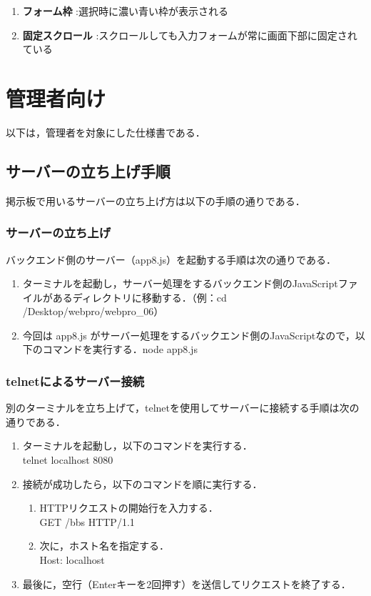 \documentclass[uplatex,dvipdfmx]{jsarticle}
\begin{document}
\begin{enumerate}
    \item \textbf{フォーム枠} :選択時に濃い青い枠が表示される
    \item \textbf{固定スクロール} :スクロールしても入力フォームが常に画面下部に固定されている
\end{enumerate}



\clearpage
\section{管理者向け}
以下は，管理者を対象にした仕様書である．

\subsection{サーバーの立ち上げ手順}
掲示板で用いるサーバーの立ち上げ方は以下の手順の通りである．

\subsubsection{サーバーの立ち上げ}
バックエンド側のサーバー（app8.js）を起動する手順は次の通りである．
\begin{enumerate}
    \item ターミナルを起動し，サーバー処理をするバックエンド側のJavaScriptファイルがあるディレクトリに移動する．（例：cd /Desktop/webpro/webpro\_06）
    \item 今回は app8.js がサーバー処理をするバックエンド側のJavaScriptなので，以下のコマンドを実行する．node app8.js
\end{enumerate}

\subsubsection{telnetによるサーバー接続}
別のターミナルを立ち上げて，telnetを使用してサーバーに接続する手順は次の通りである．
\begin{enumerate} 
    \item ターミナルを起動し，以下のコマンドを実行する．\\
    telnet localhost 8080
    \item 接続が成功したら，以下のコマンドを順に実行する．
    \begin{enumerate} 
        \item HTTPリクエストの開始行を入力する．\\
        GET /bbs HTTP/1.1
        \item 次に，ホスト名を指定する．\\
        Host: localhost
    \end{enumerate} 
    \item 最後に，空行（Enterキーを2回押す）を送信してリクエストを終了する． 
\end{enumerate}
\end{document}

